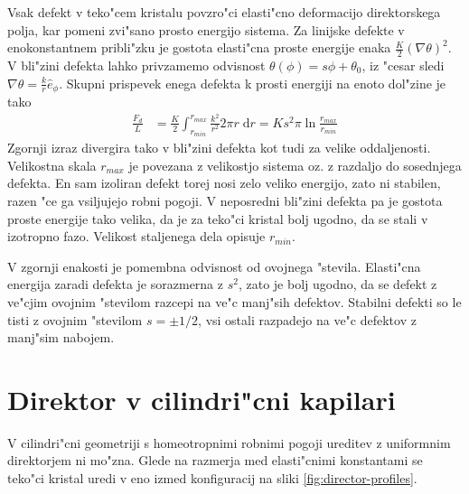 \documentclass[12pt,twoside,openright,final]{report}
\newcommand{\dd}{\ensuremath{\;\mathrm{d}}}
\begin{document}
Vsak defekt v teko"cem kristalu povzro"ci elasti"cno deformacijo direktorskega polja, kar pomeni zvi"sano prosto energijo sistema. 
Za linijske defekte v enokonstantnem pribli"zku je gostota elasti"cna proste energije enaka $\frac{K}{2}(\nabla \theta)^2$. 
V bli"zini defekta lahko privzamemo odvisnost $\theta(\phi) = s \phi + \theta_0$, iz "cesar sledi $\nabla\theta = \frac{k}{r}\hat e_\phi$. 
Skupni prispevek enega defekta k prosti energiji na enoto dol"zine je tako\cite{degennes}
\begin{align}
 \frac{F_d}{L} &= \frac{K}{2} \int_{r_{min}}^{r_{max}} \frac{k^2}{r^2} 2\pi r \dd r = K s^2 \pi \ln{\frac{r_{max}}{r_{min}}}
\end{align}
Zgornji izraz divergira tako v bli"zini defekta kot tudi za velike oddaljenosti. 
Velikostna skala $r_{max}$ je povezana z velikostjo sistema oz. z razdaljo do sosednjega defekta. 
En sam izoliran defekt torej nosi zelo veliko energijo, zato ni stabilen, razen "ce ga vsiljujejo robni pogoji. 
V neposredni bli"zini defekta pa je gostota proste energije tako velika, da je za teko"ci kristal bolj ugodno, da se stali v izotropno fazo. 
Velikost staljenega dela opisuje $r_{min}$. 

V zgornji enakosti je pomembna odvisnost od ovojnega "stevila. 
Elasti"cna energija zaradi defekta je sorazmerna z $s^2$, zato je bolj ugodno, da se defekt z ve"cjim ovojnim "stevilom razcepi na ve"c manj"sih defektov. 
Stabilni defekti so le tisti z ovojnim "stevilom $s=\pm1/2$, vsi ostali razpadejo na ve"c defektov z manj"sim nabojem. 

\section{Direktor v cilindri"cni kapilari}

V cilindri"cni geometriji s homeotropnimi robnimi pogoji ureditev z uniformnim direktorjem ni mo"zna. 
Glede na razmerja med elasti"cnimi konstantami se teko"ci kristal uredi v eno izmed konfiguracij na sliki \ref{fig:director-profiles}. 
\end{document}
